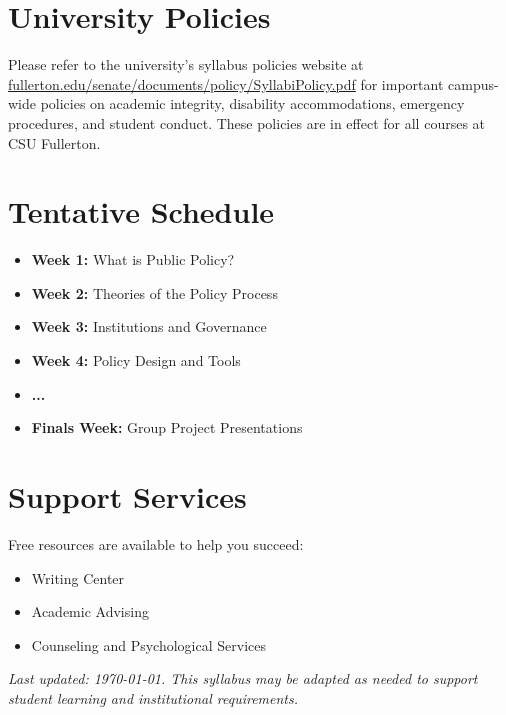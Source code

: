 \documentclass[11pt]{article}
\begin{document}
\section*{University Policies}
Please refer to the university’s syllabus policies website at \href{https://www.fullerton.edu/senate/documents/policy/SyllabiPolicy.pdf}{fullerton.edu/senate/documents/policy/SyllabiPolicy.pdf} for important campus-wide policies on academic integrity, disability accommodations, emergency procedures, and student conduct. These policies are in effect for all courses at CSU Fullerton.

\section*{Tentative Schedule}
\begin{itemize}[leftmargin=1.5em]
  \item \textbf{Week 1:} What is Public Policy?
  \item \textbf{Week 2:} Theories of the Policy Process
  \item \textbf{Week 3:} Institutions and Governance
  \item \textbf{Week 4:} Policy Design and Tools
  \item \textbf{...}
  \item \textbf{Finals Week:} Group Project Presentations
\end{itemize}

\section*{Support Services}
Free resources are available to help you succeed:
\begin{itemize}[leftmargin=1.5em]
  \item Writing Center
  \item Academic Advising
  \item Counseling and Psychological Services
\end{itemize}

\vfill
\noindent\textit{Last updated: \today. This syllabus may be adapted as needed to support student learning and institutional requirements.}
\end{document}
